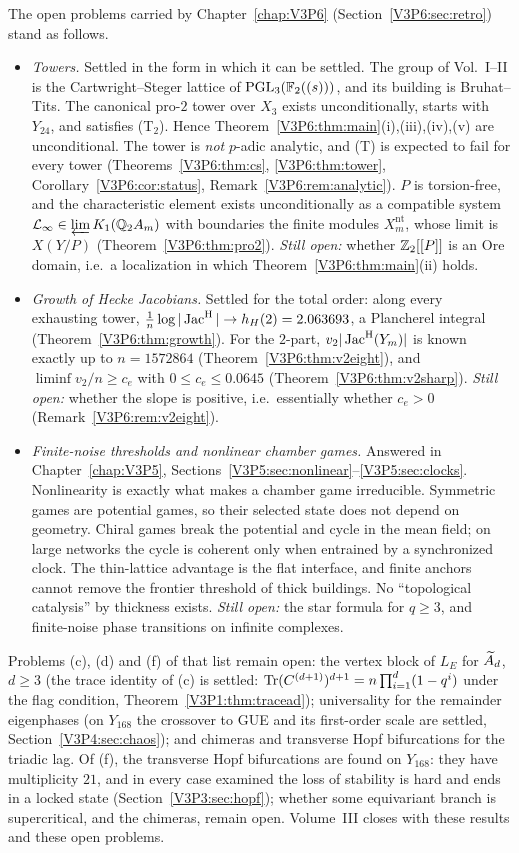 The open problems carried by Chapter~\ref{chap:V3P6} (Section~\ref{V3P6:sec:retro}) stand as follows.
\begin{itemize}
\item[(a)] \emph{Towers.} Settled in the form in which it can be settled. The group of Vol.~I--II
is the Cartwright--Steger lattice of $\mathrm{PGL}_3(\mathbb{F}_2((s)))$, and its building is Bruhat--Tits. The
canonical pro-$2$ tower over $X_3$ exists unconditionally, starts with $Y_{24}$, and satisfies
(T$_2$). Hence Theorem~\ref{V3P6:thm:main}(i),(iii),(iv),(v) are unconditional. The tower is
\emph{not} $p$-adic analytic, and (T) is expected to fail for every tower
(Theorems~\ref{V3P6:thm:cs}, \ref{V3P6:thm:tower}, Corollary~\ref{V3P6:cor:status},
Remark~\ref{V3P6:rem:analytic}). $P$ is torsion-free, and the characteristic element exists
unconditionally as a compatible system $\mathcal L_\infty\in\varprojlim K_1(\mathbb{Q}_2A_m)$ with
boundaries the finite modules $X_m^{\mathrm{nt}}$, whose limit is $X(Y/P)$
(Theorem~\ref{V3P6:thm:pro2}). \emph{Still open:} whether $\mathbb{Z}_2[[P]]$ is an Ore domain, i.e.\ a
localization in which Theorem~\ref{V3P6:thm:main}(ii) holds.
\item[(b)] \emph{Growth of Hecke Jacobians.} Settled for the total order: along every exhausting
tower, $\frac1n\log|\operatorname{Jac}^{\mathrm{H}}|\to h_H(2)=2.063693$, a Plancherel integral
(Theorem~\ref{V3P6:thm:growth}). For the $2$-part, $v_2|\operatorname{Jac}^{\mathrm{H}}(Y_m)|$ is known exactly up to
$n=1572864$ (Theorem~\ref{V3P6:thm:v2eight}), and $\liminf v_2/n\ge c_e$ with $0\le c_e\le0.0645$
(Theorem~\ref{V3P6:thm:v2sharp}). \emph{Still open:} whether the slope is positive, i.e.\
essentially whether $c_e>0$ (Remark~\ref{V3P6:rem:v2eight}).
\item[(e)] \emph{Finite-noise thresholds and nonlinear chamber games.} Answered in Chapter~\ref{chap:V3P5},
Sections~\ref{V3P5:sec:nonlinear}--\ref{V3P5:sec:clocks}. Nonlinearity is exactly what makes a
chamber game irreducible. Symmetric games are potential games, so their selected state does not
depend on geometry. Chiral games break the potential and cycle in the mean field; on large
networks the cycle is coherent only when entrained by a synchronized clock. The thin-lattice
advantage is the flat interface, and finite anchors cannot remove the frontier threshold of
thick buildings. No ``topological catalysis'' by thickness exists. \emph{Still open:} the star
formula for $q\ge3$, and finite-noise phase transitions on infinite complexes.
\end{itemize}
Problems (c), (d) and (f) of that list remain open: the vertex block of $L_E$ for $\widetilde A_{d}$,
$d\ge3$ (the trace identity of (c) is settled: $\operatorname{Tr}(C^{(d+1)})^{d+1}=n\prod_{i=1}^{d}(1-q^{i})$ under
the flag condition, Theorem~\ref{V3P1:thm:tracead}); universality for the remainder eigenphases (on $Y_{168}$ the crossover to GUE and its
first-order scale are settled, Section~\ref{V3P4:sec:chaos}); and chimeras and transverse Hopf bifurcations
for the triadic lag. Of (f), the transverse Hopf bifurcations are found on $Y_{168}$: they have
multiplicity $21$, and in every case examined the loss of stability is hard and ends in a locked state
(Section~\ref{V3P3:sec:hopf}); whether some equivariant branch is supercritical, and the chimeras,
remain open. Volume~III closes with these results and these open problems.
